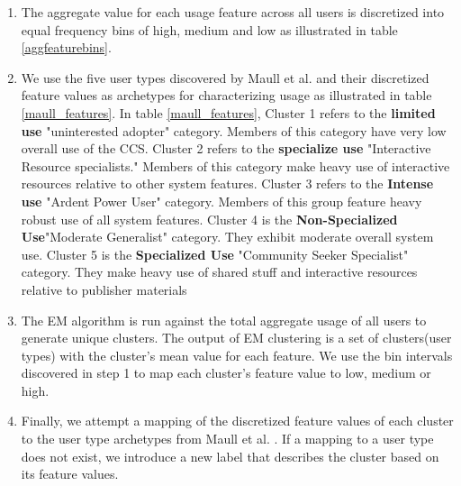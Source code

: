 \documentclass{acm_proc_article-sp}
\begin{document}
\begin{enumerate}
\item The aggregate value for each usage feature across all users is discretized into equal frequency bins of high, medium and low as illustrated in table \ref{aggfeaturebins}.

\item We use the five user types discovered by Maull et al. \cite{maullunderstanding} and their discretized feature values as archetypes for characterizing usage as illustrated in table \ref{maull_features}. In table \ref{maull_features}, Cluster 1 refers to the \textbf{limited use} "uninterested adopter" category. Members of this category have very low overall use of the CCS. Cluster 2 refers to the \textbf{specialize use} "Interactive Resource specialists." Members of this category make heavy use of interactive resources relative to other system features. Cluster 3 refers to the \textbf{Intense use} "Ardent Power User" category. Members of this group feature heavy robust use of all system features. Cluster 4 is the \textbf{Non-Specialized Use}"Moderate Generalist" category. They exhibit moderate overall system use. Cluster 5 is the \textbf{Specialized Use} "Community Seeker Specialist" category. They make heavy use of shared stuff and interactive resources relative to publisher materials

\item The EM algorithm is run against the total aggregate usage of all users to generate unique clusters. The output of EM clustering is a set of clusters(user types) with the cluster's mean value for each feature. We use the bin intervals discovered in step 1 to map each cluster's feature value to low, medium or high.

\item Finally, we attempt a mapping of the discretized feature values of each cluster to the user type archetypes from Maull et al. \cite{maullunderstanding}. If a mapping to a user type does not exist, we introduce a new label that describes the cluster based on its feature values.


\end{enumerate}
\end{document}
